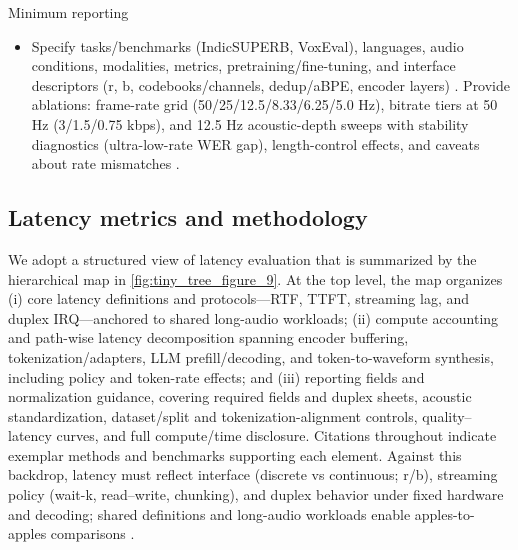 \documentclass{article}
\begin{document}
Minimum reporting
\begin{itemize}
  \item Specify tasks/benchmarks (IndicSUPERB, VoxEval), languages, audio conditions, modalities, metrics, pretraining/fine-tuning, and interface descriptors (r, b, codebooks/channels, dedup/aBPE, encoder layers) \cite{cui2025voxevalbenchmarkingknowledgeunderstandin,entry2025indicsuperbspeechprocessinguniversalperf,ji2025languagecodecbridgingdiscreterepresentat,zhang2025impactframeratesspeechtokenizercasestudy,huang2024repcodecspeechrepresentationcodectokeniz}. Provide ablations: frame-rate grid (50/25/12.5/8.33/6.25/5.0 Hz), bitrate tiers at 50 Hz (3/1.5/0.75 kbps), and 12.5 Hz acoustic-depth sweeps with stability diagnostics (ultra-low-rate WER gap), length-control effects, and caveats about rate mismatches \cite{poli2025fastabxlibraryefficientcomputationabxdis,vashishth2024stabspeechtokenizerassessmentbenchmark,maimon2025salmonsuiteacousticlanguagemodelevaluati,wang2025tadicodectextawarediffusionspeechtokeniz,hsu2024exploringcontextlearningtextlessspeechla,li2024investigatingneuralaudiocodecsspeechlang}.
\end{itemize}

\subsection{Latency metrics and methodology} \label{subsec:Latency metrics and methodology}
We adopt a structured view of latency evaluation that is summarized by the hierarchical map in \autoref{fig:tiny_tree_figure_9}. At the top level, the map organizes (i) core latency definitions and protocols---RTF, TTFT, streaming lag, and duplex IRQ---anchored to shared long-audio workloads; (ii) compute accounting and path-wise latency decomposition spanning encoder buffering, tokenization/adapters, LLM prefill/decoding, and token-to-waveform synthesis, including policy and token-rate effects; and (iii) reporting fields and normalization guidance, covering required fields and duplex sheets, acoustic standardization, dataset/split and tokenization-alignment controls, quality--latency curves, and full compute/time disclosure. Citations throughout indicate exemplar methods and benchmarks supporting each element. Against this backdrop, latency must reflect interface (discrete vs continuous; r/b), streaming policy (wait-k, read--write, chunking), and duplex behavior under fixed hardware and decoding; shared definitions and long-audio workloads enable apples-to-apples comparisons \cite{li2025televaldynamicbenchmarkdesignedspokenlan}.
\end{document}
